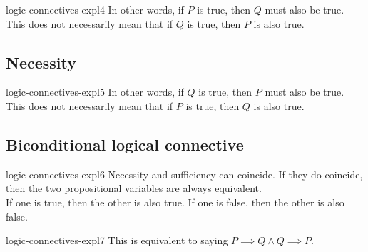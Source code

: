 \documentclass[preview]{standalone}
\begin{document}

\begin{snippet}{logic-connectives-expl4}
In other words, if \(P\) is true, then \(Q\) must also be true.
This does \underline{not} necessarily mean that if \(Q\) is true, then \(P\) is also true.
\end{snippet}


\subsection{Necessity}


\begin{snippet}{logic-connectives-expl5}
In other words, if \(Q\) is true, then \(P\) must also be true.
This does \underline{not} necessarily mean that if \(P\) is true, then \(Q\) is also true.
\end{snippet}


\subsection{Biconditional logical connective}

\begin{snippet}{logic-connectives-expl6}
Necessity and sufficiency can coincide. If they do coincide,
then the two propositional variables are always equivalent. \\
If one is true, then the other is also true. If one is false, then the other is also false.
\end{snippet}


\begin{snippet}{logic-connectives-expl7}
This is equivalent to saying \(P \implies Q \land Q \implies P\).
\end{snippet}


\end{document}
